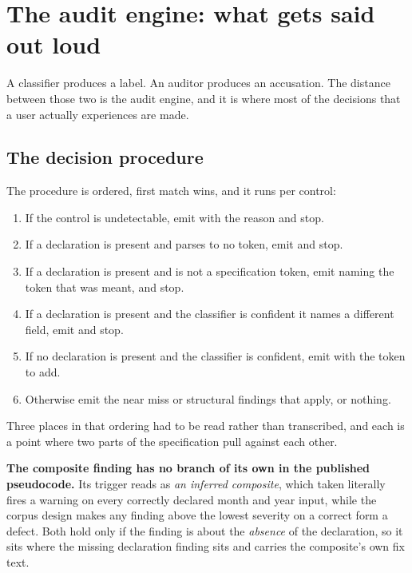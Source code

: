 \chapter{The audit engine: what gets said out loud}
\label{ch:audit}

A classifier produces a label. An auditor produces an accusation. The distance
between those two is the audit engine, and it is where most of the decisions
that a user actually experiences are made.

\section{The decision procedure}

The procedure is ordered, first match wins, and it runs per control:

\begin{enumerate}
  \item If the control is undetectable, emit  with the
    reason and stop.
  \item If a declaration is present and parses to no token, emit
     and stop.
  \item If a declaration is present and is not a specification token, emit
     naming the token that was meant, and stop.
  \item If a declaration is present and the classifier is confident it names a
    different field, emit  and stop.
  \item If no declaration is present and the classifier is confident, emit
     with the token to add.
  \item Otherwise emit the near miss or structural findings that apply, or
    nothing.
\end{enumerate}

Three places in that ordering had to be read rather than transcribed, and each is
a point where two parts of the specification pull against each other.

\textbf{The composite finding has no branch of its own in the published
pseudocode.} Its trigger reads as \emph{an inferred composite}, which taken
literally fires a warning on every correctly declared month and year input,
while the corpus design makes any finding above the lowest severity on a correct
form a defect. Both hold only if the finding is about the \emph{absence} of the
declaration, so it sits where the missing declaration finding sits and carries
the composite's own fix text.

